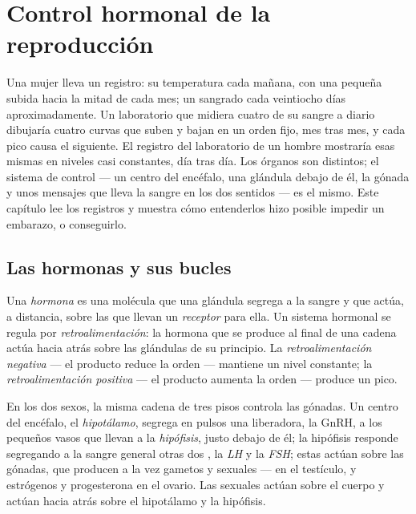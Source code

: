 \chapter{Control hormonal de la reproducción}\label{ch:g11:hormones-and-reproduction}

Una mujer lleva un registro: su temperatura cada mañana, con una
pequeña subida hacia la mitad de cada mes; un sangrado cada veintiocho
días aproximadamente. Un laboratorio que midiera cuatro  de su
sangre a diario dibujaría cuatro curvas que suben y bajan en un orden
fijo, mes tras mes, y cada pico causa el siguiente. El registro del
laboratorio de un hombre mostraría esas mismas  en niveles casi
constantes, día tras día. Los órganos son distintos; el sistema de
control --- un centro del encéfalo, una glándula debajo de él, la
gónada y unos mensajes que lleva la sangre en los dos sentidos --- es
el mismo. Este capítulo lee los registros y muestra cómo entenderlos
hizo posible impedir un embarazo, o conseguirlo.

\section{Las hormonas y sus bucles}

\begin{definition}\label{def:g11:hormones-and-reproduction:hormone}
Una \emph{hormona} es una molécula que una glándula
segrega a la sangre y que actúa, a distancia, sobre las  que
llevan un \emph{receptor} para ella. Un sistema hormonal se regula por
\emph{retroalimentación}: la hormona que se
produce al final de una cadena actúa hacia atrás sobre las glándulas de
su principio. La \emph{retroalimentación negativa} --- el producto
reduce la orden --- mantiene un nivel constante; la
\emph{retroalimentación positiva} --- el producto aumenta la orden ---
produce un pico.
\end{definition}

\begin{proposition}\label{prop:g11:hormones-and-reproduction:chain}
En los dos sexos, la misma cadena de tres pisos controla las gónadas.
Un centro del encéfalo, el \emph{hipotálamo}, segrega en pulsos una
 liberadora, la GnRH, a los pequeños vasos que llevan a la
\emph{hipófisis}, justo debajo de él; la hipófisis responde segregando
a la sangre general otras dos , la \emph{LH} y la \emph{FSH};
estas actúan sobre las gónadas, que producen a la vez gametos y
 sexuales ---  en el testículo, y estrógenos y
progesterona en el ovario. Las  sexuales actúan sobre el cuerpo
y actúan hacia atrás sobre el hipotálamo y la hipófisis.
\end{proposition}
\admitted

